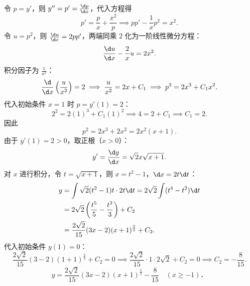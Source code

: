 \begin{solution}

    令 $p = y'$，则 $y'' = p' = \frac{\d p}{\d x}$，代入方程得
    \begin{equation}
        p' = \frac{p}{x} + \frac{x^2}{p} \implies p p' - \frac{1}{x}p^2 = x^2.
    \end{equation}
    令 $u = p^2$，则 $\frac{\d u}{\d x} = 2p p'$，两端同乘 $2$ 化为一阶线性微分方程：
    \begin{equation}
        \frac{\d u}{\d x} - \frac{2}{x}u = 2x^2.
    \end{equation}
    积分因子为 $\frac{1}{x^2}$：
    \begin{equation}
        \frac{\d}{\d x}\left( \frac{u}{x^2} \right) = 2 \implies \frac{u}{x^2} = 2x + C_1 \implies p^2 = 2x^3 + C_1 x^2.
    \end{equation}
    代入初始条件 $x = 1$ 时 $p = y'(1) = 2$：
    \begin{equation}
        2^2 = 2(1)^3 + C_1(1)^2 \implies 4 = 2 + C_1 \implies C_1 = 2.
    \end{equation}
    因此
    \begin{equation}
        p^2 = 2x^3 + 2x^2 = 2x^2(x + 1).
    \end{equation}
    由于 $y'(1) = 2 > 0$，取正根（$x > 0$）：
    \begin{equation}
        y' = \frac{\d y}{\d x} = \sqrt{2}x\sqrt{x + 1}.
    \end{equation}
    对 $x$ 进行积分，令 $t = \sqrt{x + 1}$，则 $x = t^2 - 1$，$\d x = 2t \d t$：
    \begin{equation}
        \begin{aligned}
            y & = \int \sqrt{2}(t^2 - 1)t \cdot 2t \d t = 2\sqrt{2}\int (t^4 - t^2)\d t \\
              & = 2\sqrt{2}\left( \frac{t^5}{5} - \frac{t^3}{3} \right) + C_2           \\
              & = \frac{2\sqrt{2}}{15}(3x - 2)(x + 1)^{\frac{3}{2}} + C_2.
        \end{aligned}
    \end{equation}
    代入初始条件 $y(1) = 0$：
    \begin{equation}
        \frac{2\sqrt{2}}{15}(3 - 2)(1 + 1)^{\frac{3}{2}} + C_2 = 0 \implies \frac{2\sqrt{2}}{15} \cdot 1 \cdot 2\sqrt{2} + C_2 = 0 \implies C_2 = -\frac{8}{15}.
    \end{equation}
    \begin{equation}
        \boxed{y = \frac{2\sqrt{2}}{15}(3x - 2)(x + 1)^{\frac{3}{2}} - \frac{8}{15} \quad (x \geqslant -1)．}
    \end{equation}


\end{solution}
